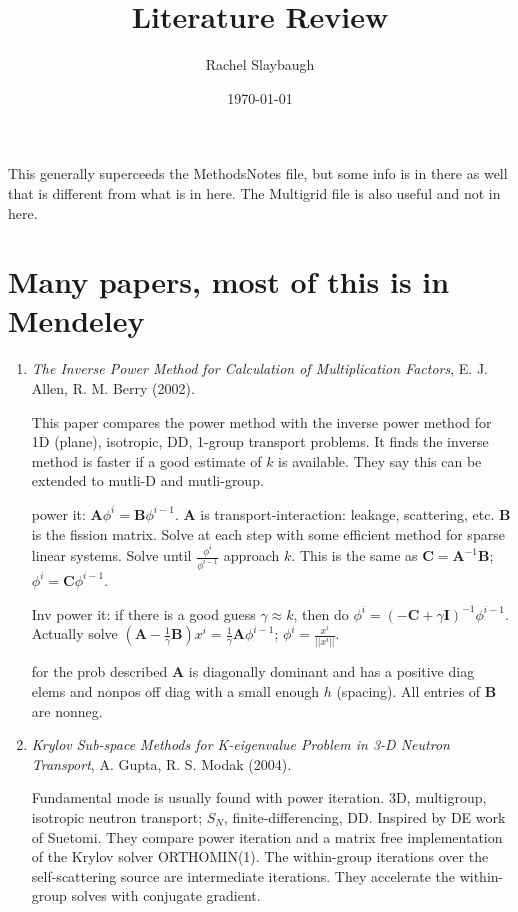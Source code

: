 \documentclass[12pt,twoside]{book}
\date{\today}
\title{Literature Review}
\author{Rachel Slaybaugh}
\newcommand{\ve}[1]{\ensuremath{\mathbf{#1}}}
\begin{document}
\maketitle
This generally superceeds the MethodsNotes file, but some info is in there as well that is different from what is in here. The Multigrid file is also useful and not in here. 

\section{Many papers, most of this is in Mendeley}
\begin{enumerate}
   \item \emph{The Inverse Power Method for Calculation of Multiplication Factors}, E. J. Allen, R. M. Berry (2002). 

This paper compares the power method with the inverse power method for 1D (plane), isotropic, DD, 1-group transport problems. It finds the inverse method is faster if a good estimate of $k$ is available. They say this can be extended to mutli-D and mutli-group.

power it: $\ve{A}\phi^i = \ve{B}\phi^{i-1}$. $\ve{A}$ is transport-interaction: leakage, scattering, etc. $\ve{B}$ is the fission matrix. Solve at each step with some efficient method for sparse linear systems. Solve until $\frac{\phi^i}{\phi^{i-1}}$ approach $k$. This is the same as $\ve{C} = \ve{A}^{-1}\ve{B}$; $\phi^i = \ve{C}\phi^{i-1}$.

Inv power it: if there is a good guess $\gamma \approx k$, then do $\phi^i = (-\ve{C} + \gamma\ve{I})^{-1}\phi^{i-1}$. Actually solve $(\ve{A} - \frac{1}{\gamma}\ve{B})x^i = \frac{1}{\gamma}\ve{A}\phi^{i-1}$; $\phi^i = \frac{x^i}{||x^i||}$.

for the prob described $\ve{A}$ is diagonally dominant and has a positive diag elems and nonpos off diag with a small enough $h$ (spacing). All entries of $\ve{B}$ are nonneg.

   \item\emph{Krylov Sub-space Methods for K-eigenvalue Problem in 3-D Neutron Transport}, A. Gupta, R. S. Modak (2004).

Fundamental mode is usually found with power iteration. 3D, multigroup, isotropic neutron transport; $S_N$, finite-differencing, DD. Inspired by DE work of Suetomi.
They compare power iteration and a matrix free implementation of the Krylov solver ORTHOMIN(1). The within-group iterations over the self-scattering source are intermediate iterations. They accelerate the within-group solves with conjugate gradient.


\end{enumerate}
\end{document}
